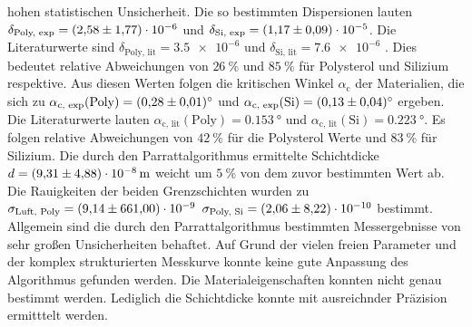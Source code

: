 hohen statistischen Unsicherheit.
Die so bestimmten Dispersionen lauten  $\delta_\text{Poly, exp} = \num{2.58 +- 1.77e-6}$ und $\delta_\text{Si, exp} = \num{1.17 +- 0.09e-5}$. Die Literaturwerte sind
$\delta_\text{Poly, lit} = \num{3.5e-6}$ und $\delta_\text{Si, lit} = \num{7.6e-6}$ \cite{V44}. Dies bedeutet relative Abweichungen von $\qty{26}{\percent}$ und 
$\qty{85}{\percent}$ für Polysterol und Silizium respektive. Aus diesen Werten folgen die kritischen Winkel $\alpha_\text{c}$ der Materialien, die sich zu 
$\alpha_\text{c, exp}(\text{Poly}) =\qty{0.28 +- 0.01}{\degree}$ und $\alpha_\text{c, exp}(\text{Si}) = \qty{0.13 +- 0.04}{\degree}$ ergeben. Die Literaturwerte lauten 
$\alpha_\text{c, lit}(\text{Poly}) =\qty{0.153}{\degree}$ und $\alpha_\text{c, lit}(\text{Si}) =\qty{0.223}{\degree}$. Es folgen relative Abweichungen von $\qty{42}{\percent}$
für die Polysterol Werte und  $\qty{83}{\percent}$ für Silizium. Die durch den Parrattalgorithmus ermittelte Schichtdicke $d = \qty{9.31 +- 4.88e-8}{\metre}$ weicht um 
$\qty{5}{\percent}$ von dem zuvor bestimmten Wert ab. 
Die Rauigkeiten der beiden Grenzschichten wurden zu $\sigma_\text{Luft, Poly} = \num{9.14 +- 661e-9}$ $\sigma_\text{Poly, Si} = \num{2.06 +- 8.22e-10}$ bestimmt. \\
Allgemein sind die durch den Parrattalgorithmus bestimmten Messergebnisse von sehr großen Unsicherheiten behaftet.
Auf Grund der vielen freien Parameter und der komplex strukturierten Messkurve konnte keine gute Anpassung des Algorithmus gefunden werden.
Die Materialeigenschaften konnten nicht genau bestimmt werden. Lediglich die Schichtdicke konnte mit ausreichnder Präzision ermitttelt werden. 
